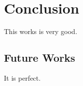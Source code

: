 \chapter*{Conclusion}
This works is very good.
\section*{Future Works}
It is perfect.
\afterpage{\blankpage}
\newpage

